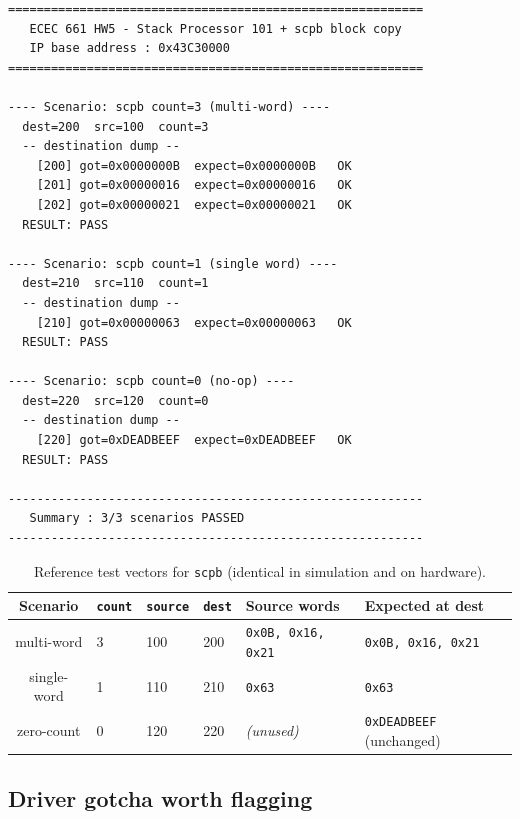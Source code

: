 \documentclass[11pt,letterpaper]{article}
\begin{document}
\begin{lstlisting}[language={},caption={Captured UART trace
                           (verbatim from the Cora~Z7-07S
                           run).},label={lst:uart}]
==========================================================
   ECEC 661 HW5 - Stack Processor 101 + scpb block copy
   IP base address : 0x43C30000
==========================================================

---- Scenario: scpb count=3 (multi-word) ----
  dest=200  src=100  count=3
  -- destination dump --
    [200] got=0x0000000B  expect=0x0000000B   OK
    [201] got=0x00000016  expect=0x00000016   OK
    [202] got=0x00000021  expect=0x00000021   OK
  RESULT: PASS

---- Scenario: scpb count=1 (single word) ----
  dest=210  src=110  count=1
  -- destination dump --
    [210] got=0x00000063  expect=0x00000063   OK
  RESULT: PASS

---- Scenario: scpb count=0 (no-op) ----
  dest=220  src=120  count=0
  -- destination dump --
    [220] got=0xDEADBEEF  expect=0xDEADBEEF   OK
  RESULT: PASS

----------------------------------------------------------
   Summary : 3/3 scenarios PASSED
----------------------------------------------------------
\end{lstlisting}

\begin{table}[H]
    \centering
    \caption{Reference test vectors for \texttt{scpb} (identical in
             simulation and on hardware).}
    \label{tab:vectors}
    \small
    \begin{tabular}{clllll}
        \toprule
        \textbf{Scenario} & \texttt{count} & \texttt{source} & \texttt{dest} & \textbf{Source words} & \textbf{Expected at dest} \\
        \midrule
        multi-word  & 3 & 100 & 200 & \texttt{0x0B, 0x16, 0x21} & \texttt{0x0B, 0x16, 0x21} \\
        single-word & 1 & 110 & 210 & \texttt{0x63}              & \texttt{0x63}              \\
        zero-count  & 0 & 120 & 220 & \emph{(unused)}            & \texttt{0xDEADBEEF} (unchanged) \\
        \bottomrule
    \end{tabular}
\end{table}

\subsection{Driver gotcha worth flagging}
\end{document}
